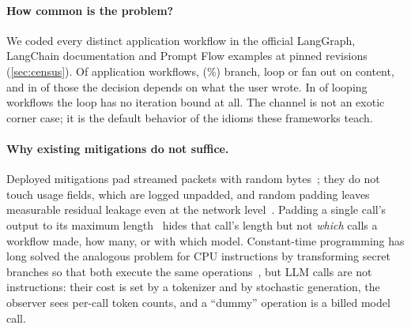 \paragraph{How common is the problem?} We coded every distinct application workflow in the official LangGraph, LangChain documentation and Prompt Flow examples at pinned revisions (\cref{sec:census}). Of \censusApps{} application workflows, \censusDependent{} (\censusPct\%) branch, loop or fan out on content, and in \censusUserDriven{} of those the decision depends on what the user wrote. In \censusUnbounded{} of \censusLoops{} looping workflows the loop has no iteration bound at all. The channel is not an exotic corner case; it is the default behavior of the idioms these frameworks teach.

\paragraph{Why existing mitigations do not suffice.} Deployed mitigations pad streamed packets with random bytes~\cite{cloudflare2024padding,openai2026obfuscation}; they do not touch usage fields, which are logged unpadded, and random padding leaves measurable residual leakage even at the network level~\cite{mcdonald2025whisper,zhang2025netecho,li2026merged}. Padding a single call's output to its maximum length~\cite{zhang2024timewilltell} hides that call's length but not \emph{which} calls a workflow made, how many, or with which model. Constant-time programming has long solved the analogous problem for CPU instructions by transforming secret branches so that both execute the same operations~\cite{agat2000transforming,molnar2005pc,cauligi2019fact,ngo2017constant}, but LLM calls are not instructions: their cost is set by a tokenizer and by stochastic generation, the observer sees per-call token counts, and a ``dummy'' operation is a billed model call.

